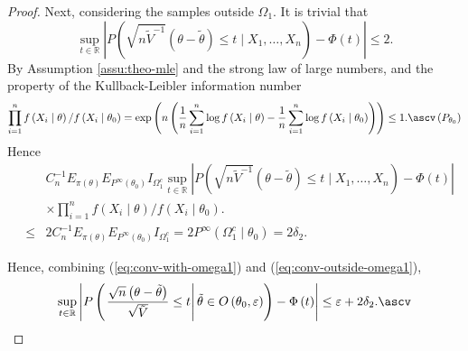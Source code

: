\begin{proof}
Next, considering the samples outside $\Omega_{1}$. It is trivial
that 
\[
\sup_{t\in\mathbb{R}}\left|P\left(\sqrt{n\tilde{V}^{-1}}\left(\theta-\tilde{\theta}\right)\le t\mid X_{1},\ldots,X_{n}\right)-\Phi\left(t\right)\right|\le2.
\]
By Assumption \ref{assu:theo-mle} and the strong law of large numbers,
and the property of the Kullback-Leibler information number 
\[
\prod_{i=1}^{n}f\left(X_{i}\mid\theta\right)/f\left(X_{i}\mid\theta_{0}\right)=\exp\left(n\left(\frac{1}{n}\sum_{i=1}^{n}\log f\left(X_{i}\mid\theta\right)-\frac{1}{n}\sum_{i=1}^{n}\log f\left(X_{i}\mid\theta_{0}\right)\right)\right)\le1.\ascv\left(P_{\theta_{0}}\right)
\]
Hence
\begin{eqnarray}
 &  & C_{n}^{-1}E_{\pi\left(\theta\right)}E_{P^{\infty}\left(\theta_{0}\right)}I_{\Omega_{1}^{c}}\sup_{t\in\mathbb{R}}\left|P\left(\sqrt{n\tilde{V}^{-1}}\left(\theta-\tilde{\theta}\right)\le t\mid X_{1},\ldots,X_{n}\right)-\Phi\left(t\right)\right| \\
 &  & \times \prod_{i=1}^{n}f\left(X_{i}\mid\theta\right)/f\left(X_{i}\mid\theta_{0}\right).\nonumber \\
 & \le & 2C_{n}^{-1}E_{\pi\left(\theta\right)}E_{P^{\infty}\left(\theta_{0}\right)}I_{\Omega_{1}^{c}}=2P^{\infty}\left(\Omega_{1}^{c}\mid\theta_{0}\right)=2\delta_{2}.\label{eq:conv-outside-omega1}
\end{eqnarray}


Hence, combining (\ref{eq:conv-with-omega1}) and (\ref{eq:conv-outside-omega1}),
\[
\sup_{t\in\mathbb{R}}\left|P\left(\left.\frac{\sqrt{n}\left(\theta-\tilde{\theta}\right)}{\sqrt{\tilde{V}}}\le t\right|\tilde{\theta}\in O\left(\theta_{0},\varepsilon\right)\right)-\Phi\left(t\right)\right|\le\varepsilon+2\delta_{2}.\ascv
\]

\end{proof}

